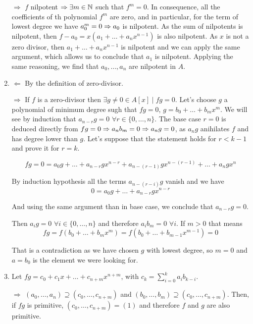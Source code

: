 \begin{sol}
\begin{enumerate}[label=(\roman*)]
	$\boxed{\Rightarrow}$ $f$ nilpotent $\Rightarrow \exists m \in \mathbb{N}$ such that $f^m = 0$. In consequence, all the coefficients of th polynomial $f^m$ are zero, and in particular, for the term of lowest degree we have $a_0^m = 0 \Rightarrow a_0$ is nilpotent. As the sum of nilpotents is nilpotent, then $f-a_0 = x(a_1 + \dots + a_n x^{n-1})$ is also nilpotent. As $x$ is not a zero divisor, then $a_1 + \dots + a_n x^{n-1}$ is nilpotent and we can apply the same argument, which allows us to conclude that $a_1$ is nilpotent. Applying the same reasoning, we find that $a_0, \dots, a_n$ are nilpotent in $A$.
	
	\item $\boxed{\Leftarrow}$ By the definition of zero-divisor.

	$\boxed{\Rightarrow}$ If $f$ is a zero-divisor then $\exists g \neq 0 \in A[x] \mid fg = 0$. Let's choose $g$ a polynomial of minimum degree sugh that $fg = 0$, $g = b_0 + \dots + b_m x^m$. We will see by induction that $a_{n-r} g = 0 \, \, \forall r \in \{0, \dots, n\}$. The base case $r = 0$ is deduced directly from $fg = 0 \Rightarrow a_n b_m = 0 \Rightarrow a_n g = 0$, as $a_n g$ anihilates $f$ and has degree lower than $g$. Let's suppose that the statement holds for $r < k-1$ and prove it for $r = k$. 

	\[
		fg = 0 = a_0 g + \dots + a_{n-r}g x^{n-r} + a_{n-(r-1)}g x^{n-(r-1)} + \dots + a_n g x^n
	\]

	By induction hypothesis all the terms $a_{n-(r-i)}g$ vanish and we have 
	\[
		0 = a_0 g + \dots + a_{n-r}g x^{n-r}
	\]

	And using the same argument than in base case, we conclude that $a_{n-r}g = 0$.

	Then $a_i g = 0 \, \, \forall i \in \{0 , \dots , n\}$ and therefore $a_i b_m = 0 \, \, \forall i$. If $m > 0$ that means 
	\[
		fg = f(b_0 + \dots + b_m x^m) = f(b_0 + \dots + b_{m-1} x^{m-1}) = 0
	\]

	That is a contradiction as we have chosen $g$ with lowest degree, so $m = 0$ and $a = b_0$ is the element we were looking for.


	\item Let $fg = c_0 + c_1 x + \dots + c_{n+m}x^{n+m}$, with $c_k = \sum_{i = 0}^k a_i b_{k-i}$.

	$\boxed{\Rightarrow}$ $(a_0, \dots, a_n) \supseteq (c_0, \dots, c_{n+m})$ and $(b_0, \dots, b_m) \supseteq (c_0, \dots, c_{n+m})$. Then, if $fg$ is primitive, $(c_0, \dots, c_{n+m}) = (1)$ and therefore $f$ and $g$ are also primitive.


\end{enumerate}
\end{sol}
